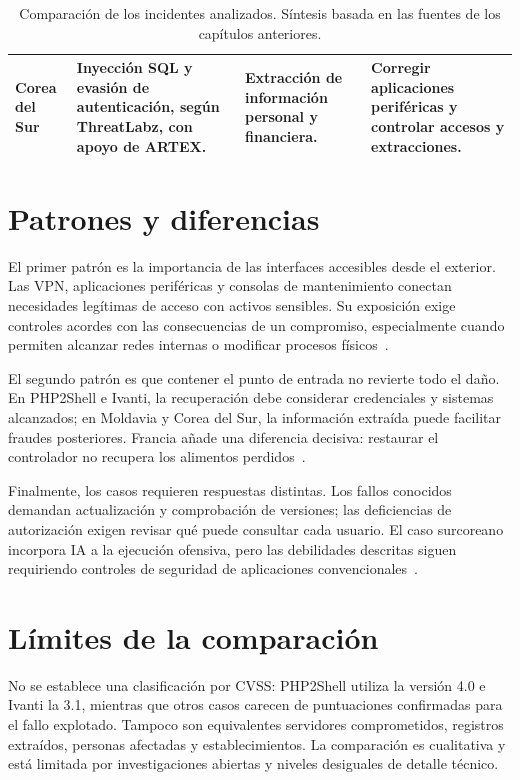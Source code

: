\begin{table}[htbp]
\begin{tabularx}{\textwidth}{
        @{}p{2.1cm}XXX@{}
        }
        Corea del Sur                         &
        Inyección SQL y evasión de autenticación,
        según ThreatLabz, con apoyo de ARTEX. &
        Extracción de información personal
        y financiera.                         &
        Corregir aplicaciones periféricas y
        controlar accesos y extracciones.                                                           \\
        \bottomrule
    \end{tabularx}
    \caption{Comparación de los incidentes analizados.
        Síntesis basada en las fuentes de los capítulos anteriores.}
    \label{tab:comparativa}
\end{table}

\section{Patrones y diferencias}
El primer patrón es la importancia de las interfaces
accesibles desde el exterior. Las VPN, aplicaciones
periféricas y consolas de mantenimiento conectan
necesidades legítimas de acceso con activos sensibles.
Su exposición exige controles acordes con las
consecuencias de un compromiso, especialmente cuando
permiten alcanzar redes internas o modificar procesos
físicos~\cite{volexity2026ivanti,certfr2026frigorificos,
    zscaler2026corea}.

El segundo patrón es que contener el punto de entrada
no revierte todo el daño. En PHP2Shell e Ivanti,
la recuperación debe considerar credenciales y sistemas
alcanzados; en Moldavia y Corea del Sur, la información
extraída puede facilitar fraudes posteriores.
Francia añade una diferencia decisiva: restaurar
el controlador no recupera los alimentos
perdidos~\cite{dream2026php,volexity2026ivanti,
    age2026datos,zscaler2026corea,onyphe2026francia}.

Finalmente, los casos requieren respuestas distintas.
Los fallos conocidos demandan actualización y comprobación
de versiones; las deficiencias de autorización exigen
revisar qué puede consultar cada usuario.
El caso surcoreano incorpora IA a la ejecución ofensiva,
pero las debilidades descritas siguen requiriendo
controles de seguridad de aplicaciones
convencionales~\cite{zscaler2026corea}.

\section{Límites de la comparación}
No se establece una clasificación por CVSS:
PHP2Shell utiliza la versión 4.0 e Ivanti la 3.1,
mientras que otros casos carecen de puntuaciones
confirmadas para el fallo explotado.
Tampoco son equivalentes servidores comprometidos,
registros extraídos, personas afectadas y establecimientos.
La comparación es cualitativa y está limitada por
investigaciones abiertas y niveles desiguales
de detalle técnico.